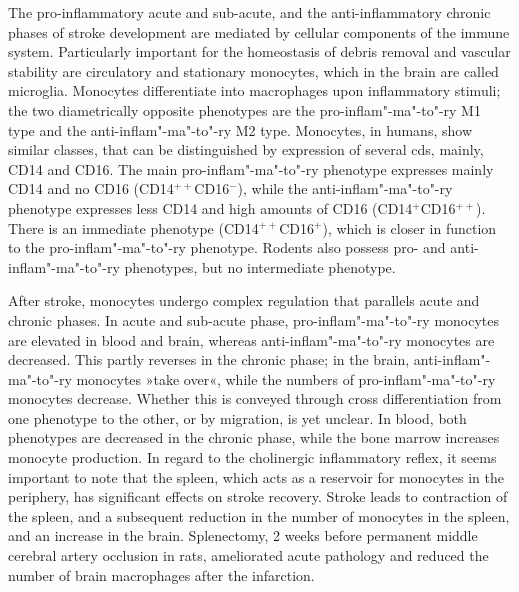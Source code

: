 The pro-inflammatory acute and sub-acute, and the anti-inflammatory chronic phases of stroke development are mediated by cellular components of the immune system. Particularly important for the homeostasis of debris removal and vascular stability are circulatory and stationary monocytes,\cite{ElAli2016} which in the brain are called microglia. Monocytes differentiate into macrophages upon inflammatory stimuli; the two diametrically opposite phenotypes are the pro-inflam"-ma"-to"-ry M1 type and the anti-inflam"-ma"-to"-ry M2 type. Monocytes, in humans, show similar classes, that can be distinguished by expression of several \acp{cd}, mainly, CD14 and CD16. The main pro-inflam"-ma"-to"-ry phenotype expresses mainly CD14 and no CD16 (CD14$^{++}$CD16$^{-}$), while the anti-inflam"-ma"-to"-ry phenotype expresses less CD14 and high amounts of CD16 (CD14$^{+}$CD16$^{++}$). There is an immediate phenotype (CD14$^{++}$CD16$^{+}$), which is closer in function to the pro-inflam"-ma"-to"-ry phenotype. Rodents also possess pro- and anti-inflam"-ma"-to"-ry phenotypes, but no intermediate phenotype.\cite{ElAli2016}

After stroke, monocytes undergo complex regulation that parallels acute and chronic phases. In acute and sub-acute phase, pro-inflam"-ma"-to"-ry monocytes are elevated in blood and brain, whereas anti-inflam"-ma"-to"-ry monocytes are decreased. This partly reverses in the chronic phase; in the brain, anti-inflam"-ma"-to"-ry monocytes »take over«, while the numbers of pro-inflam"-ma"-to"-ry monocytes decrease. Whether this is conveyed through cross differentiation from one phenotype to the other, or by migration, is yet unclear.\cite{ElAli2016} In blood, both phenotypes are decreased in the chronic phase, while the bone marrow increases monocyte production. In regard to the cholinergic inflammatory reflex, it seems important to note that the spleen, which acts as a reservoir for monocytes in the periphery,\cite{Swirski2009} has significant effects on stroke recovery. Stroke leads to contraction of the spleen, and a subsequent reduction in the number of monocytes in the spleen, and an increase in the brain.\cite{Kim2014} Splenectomy, 2 weeks before permanent middle cerebral artery occlusion in rats, ameliorated acute pathology and reduced the number of brain macrophages after the infarction.\cite{Ajmo2008}

